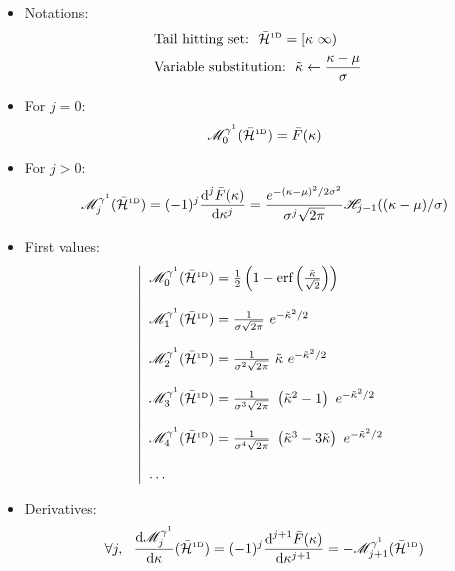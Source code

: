 \documentclass[a4paper,12pt]{article}
\begin{document}
\begin{itemize}
\item Notations:
  \begin{subequations}
    \begin{flalign}
      & \text{Tail hitting set:} \ \ \bar{\mathcal{H}}^{\text{\tiny1D}}=[\kappa\ \infty) & \\
      & \text{Variable substitution:} \ \ \tilde{\kappa} \leftarrow \frac{\kappa-\mu}{\sigma} &
    \end{flalign}
  \end{subequations}
\item For $j=0$:
\begin{equation}
  \mathscr{M}^{\gamma^1}_0(\bar{\mathcal{H}}^{\text{\tiny1D}})=\bar{F}(\kappa)
\end{equation}
\item For $j>0$:
\begin{equation}
  \mathscr{M}^{\gamma^1}_j(\bar{\mathcal{H}}^{\text{\tiny1D}})=(-1)^j\frac{\text{d}^j\bar{F}(\kappa)}{\text{d}\kappa^j}=\frac{e^{-(\kappa-\mu)^2/2\sigma^2}}{\sigma^j\sqrt{2\pi}}\mathscr{H}_{j-1}((\kappa-\mu)/\sigma)
\end{equation}
\item First values:
\begin{equation}
  \left|
  \begin{array}{l}
    \GMFa_0(\HST) = \frac{1}{2}\left(1-\erf\left(\frac{\clset}{\sqrt{2}}\right)\right) \\ \\
    \GMFa_1(\HST) = \frac{1}{\std  \sqrt{2\pi}}\ e^{-\clset^2/2} \\ \\
    \GMFa_2(\HST) = \frac{1}{\std^2\sqrt{2\pi}}\ \clset \ e^{-\clset^2/2} \\ \\
    \GMFa_3(\HST) = \frac{1}{\std^3\sqrt{2\pi}}\ \left(\clset^2-1\right) \ e^{-\clset^2/2} \\ \\
    \GMFa_4(\HST) = \frac{1}{\std^4\sqrt{2\pi}}\ \left(\clset^3-3\clset\right) \ e^{-\clset^2/2} \\ \\
    \dots
  \end{array}
  \right.
\end{equation}
\item Derivatives:
\begin{equation}
  \forall j, \ \ \frac{\text{d}\GMFa_j}{\text{d}\lset}(\HST)=(-1)^j\frac{\text{d}^{j+1}\TP(\lset)}{\text{d}\lset^{j+1}}=-\GMFa_{j+1}(\HST)
\end{equation}
\end{itemize}
\end{document}
